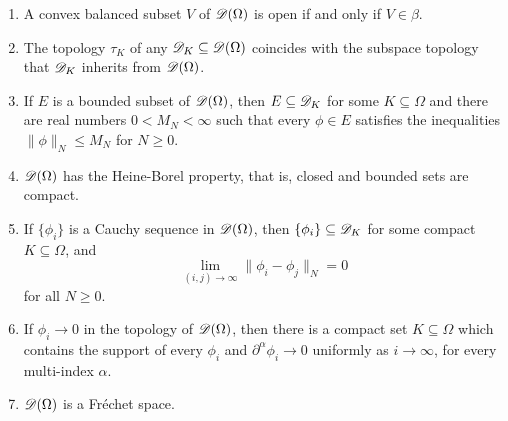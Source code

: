 \begin{theorem}
\begin{enumerate}[label=(\alph*)]
    \item A convex balanced subset $V$ of $\mathscr{D}(\Omega)$ is open if and only if $V\in\beta$. 
    \item The topology $\tau_K$ of any $\mathscr{D}_K\subseteq\mathscr{D}(\Omega)$ coincides with the subspace topology that $\mathscr{D}_K$ inherits from $\mathscr{D}(\Omega)$. 
    \item If $E$ is a bounded subset of $\mathscr{D}(\Omega)$, then $E\subseteq\mathscr{D}_K$ for some $K\subseteq\Omega$ and there are real numbers $0 < M_N < \infty$ such that every $\phi\in E$ satisfies the inequalities $\|\phi\|_N\le M_N$ for $N\ge 0$.
    \item $\mathscr{D}(\Omega)$ has the Heine-Borel property, that is, closed and bounded sets are compact. 
    \item If $\{\phi_i\}$ is a Cauchy sequence in $\mathscr{D}(\Omega)$, then $\{\phi_i\}\subseteq\mathscr{D}_K$ for some compact $K\subseteq\Omega$, and 
    \begin{equation*}
        \lim_{(i,j)\to\infty}\|\phi_i - \phi_j\|_N = 0
    \end{equation*}
    for all $N\ge 0$. 
    \item If $\phi_i\to 0$ in the topology of $\mathscr{D}(\Omega)$, then there is a compact set $K\subseteq\Omega$ which contains the support of every $\phi_i$ and $\partial^\alpha\phi_i\to 0$ uniformly as $i\to\infty$, for every multi-index $\alpha$.
    \item $\mathscr{D}(\Omega)$ is a Fr\'echet space.
\end{enumerate}
\end{theorem}
